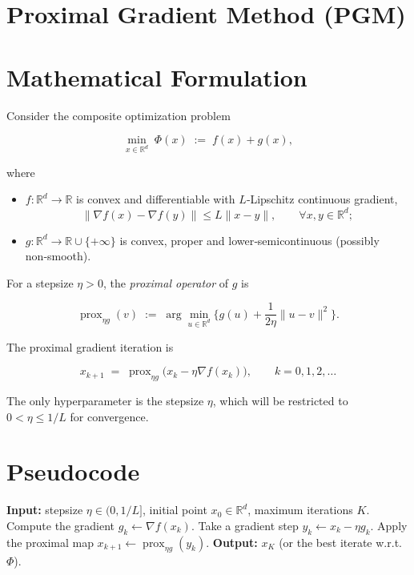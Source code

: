 \documentclass{article}
\newcommand{\prox}{\operatorname{prox}}
\newcommand{\R}{\mathbb{R}}
\begin{document}
\section*{Proximal Gradient Method (PGM)}

\section*{Mathematical Formulation}
Consider the composite optimization problem  

\[
\min_{x\in\R^{d}} \; \Phi(x)\;:=\;f(x)+g(x),
\tag{1}
\]

where  

\begin{itemize}[noitemsep]
  \item $f:\R^{d}\!\to\!\R$ is convex and differentiable with $L$‑Lipschitz continuous gradient,
        \[
        \|\nabla f(x)-\nabla f(y)\|\le L\|x-y\|,\qquad\forall x,y\in\R^{d};
        \tag{2}
        \]
  \item $g:\R^{d}\!\to\!\R\cup\{+\infty\}$ is convex, proper and lower‑semicontinuous (possibly non‑smooth).
\end{itemize}

For a stepsize $\eta>0$, the \emph{proximal operator} of $g$ is  

\[
\prox_{\eta g}(v)\;:=\;\arg\min_{u\in\R^{d}}
\Big\{ g(u)+\frac{1}{2\eta}\|u-v\|^{2}\Big\}.
\tag{3}
\]

The proximal gradient iteration is  

\[
x_{k+1}\;=\;\prox_{\eta g}\!\bigl(x_{k}-\eta\nabla f(x_{k})\bigr),
\qquad k=0,1,2,\dots
\tag{4}
\]

The only hyperparameter is the stepsize $\eta$, which will be restricted to $0<\eta\le 1/L$ for convergence.

\section*{Pseudocode}
\begin{algorithm}[H]
\caption{Proximal Gradient Method}
\begin{algorithmic}[1]
\STATE \textbf{Input:} stepsize $\eta\in(0,1/L]$, initial point $x_{0}\in\R^{d}$, maximum iterations $K$.
    \STATE Compute the gradient $g_{k}\gets \nabla f(x_{k})$.
    \STATE Take a gradient step $y_{k}\gets x_{k}-\eta g_{k}$.
    \STATE Apply the proximal map $x_{k+1}\gets \prox_{\eta g}(y_{k})$.
\ENDFOR
\STATE \textbf{Output:} $x_{K}$ (or the best iterate w.r.t.\ $\Phi$).
\end{algorithmic}
\end{algorithm}
\end{document}
